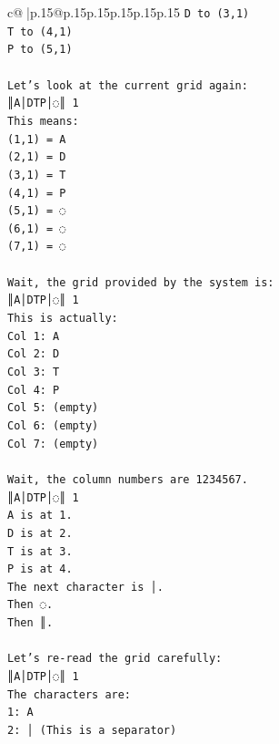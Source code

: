 \documentclass{article}
\begin{document}
{\begin{supertabular}{c@{$\;$}|p{.15\linewidth}@{}p{.15\linewidth}p{.15\linewidth}p{.15\linewidth}p{.15\linewidth}p{.15\linewidth}}
{{{\texttt{D to (3,1)} \\
\texttt{T to (4,1)} \\
\texttt{P to (5,1)} \\
\\ 
\texttt{Let's look at the current grid again:} \\
\texttt{║A│DTP│◌║ 1} \\
\texttt{This means:} \\
\texttt{(1,1) = A} \\
\texttt{(2,1) = D} \\
\texttt{(3,1) = T} \\
\texttt{(4,1) = P} \\
\texttt{(5,1) = ◌} \\
\texttt{(6,1) = ◌} \\
\texttt{(7,1) = ◌} \\
\\ 
\texttt{Wait, the grid provided by the system is:} \\
\texttt{║A│DTP│◌║ 1} \\
\texttt{This is actually:} \\
\texttt{Col 1: A} \\
\texttt{Col 2: D} \\
\texttt{Col 3: T} \\
\texttt{Col 4: P} \\
\texttt{Col 5: (empty)} \\
\texttt{Col 6: (empty)} \\
\texttt{Col 7: (empty)} \\
\\ 
\texttt{Wait, the column numbers are 1234567.} \\
\texttt{║A│DTP│◌║ 1} \\
\texttt{A is at 1.} \\
\texttt{D is at 2.} \\
\texttt{T is at 3.} \\
\texttt{P is at 4.} \\
\texttt{The next character is │.} \\
\texttt{Then ◌.} \\
\texttt{Then ║.} \\
\\ 
\texttt{Let's re{-}read the grid carefully:} \\
\texttt{║A│DTP│◌║ 1} \\
\texttt{The characters are:} \\
\texttt{1: A} \\
\texttt{2: │ (This is a separator)} \\
}}}
\end{supertabular}}
\end{document}
